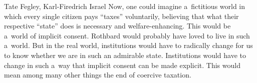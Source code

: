 \begin{artengenv2auth}{Tate Fegley, Karl-Firedrich Israel}
Now, one could imagine a~fictitious world in which every single citizen pays ``taxes'' voluntarily, believing that what their respective ``state'' does is necessary and welfare-enhancing. This would be a~world of implicit consent. Rothbard would probably have loved to live in such a~world. But in the real world, institutions would have to radically change for us to know whether we are in such an admirable state. Institutions would have to change in such a~way that implicit consent can be made explicit. This would mean among many other things the end of coercive taxation.


\end{artengenv2auth}

\label{israel-last}